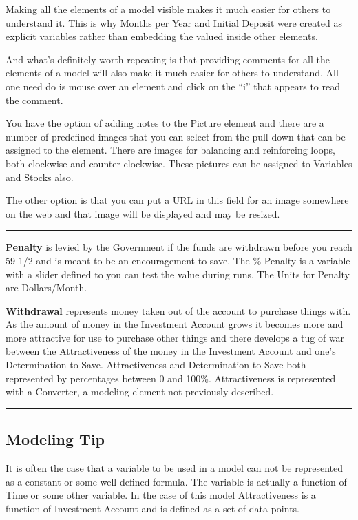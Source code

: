 \documentclass[]{memoir}
\begin{document}
Making all the elements of a model visible makes it much easier for
others to understand it. This is why Months per Year and Initial Deposit
were created as explicit variables rather than embedding the valued
inside other elements.

And what's definitely worth repeating is that providing comments for all
the elements of a model will also make it much easier for others to
understand. All one need do is mouse over an element and click on the
``i'' that appears to read the comment.

You have the option of adding notes to the Picture element and there are
a number of predefined images that you can select from the pull down
that can be assigned to the element. There are images for balancing and
reinforcing loops, both clockwise and counter clockwise. These pictures
can be assigned to Variables and Stocks also.

The other option is that you can put a URL in this field for an image
somewhere on the web and that image will be displayed and may be
resized.

\begin{center}\rule{3in}{0.4pt}\end{center}

\textbf{Penalty} is levied by the Government if the funds are withdrawn
before you reach 59 1/2 and is meant to be an encouragement to save. The
\% Penalty is a variable with a slider defined to you can test the value
during runs. The Units for Penalty are Dollars/Month.

\textbf{Withdrawal} represents money taken out of the account to
purchase things with. As the amount of money in the Investment Account
grows it becomes more and more attractive for use to purchase other
things and there develops a tug of war between the Attractiveness of the
money in the Investment Account and one's Determination to Save.
Attractiveness and Determination to Save both represented by percentages
between 0 and 100\%. Attractiveness is represented with a Converter, a
modeling element not previously described.

\begin{center}\rule{3in}{0.4pt}\end{center}

\subsection{Modeling Tip}

It is often the case that a variable to be used in a model can not be
represented as a constant or some well defined formula. The variable is
actually a function of Time or some other variable. In the case of this
model Attractiveness is a function of Investment Account and is defined
as a set of data points.
\end{document}
